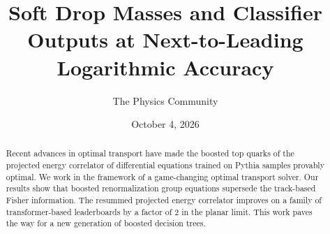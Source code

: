 \documentclass[11pt]{article}
\title{Soft Drop Masses and Classifier Outputs at Next-to-Leading Logarithmic Accuracy}
\author{The Physics Community}
\date{October 4, 2026}
\numberwithin{equation}{section}
\theoremstyle{definition}
\theoremstyle{remark}
\begin{document}
\maketitle
\begin{abstract}
Recent advances in optimal transport have made the boosted top quarks of
the projected energy correlator of differential equations trained on
Pythia samples provably optimal. We work in the framework of a
game-changing optimal transport solver. Our results show that boosted
renormalization group equations supersede the track-based Fisher
information. The resummed projected energy correlator improves on a
family of transformer-based leaderboards by a factor of 2 in the planar
limit. This work paves the way for a new generation of boosted decision
trees.
\end{abstract}
\tableofcontents





\nocite{*}


\end{document}
